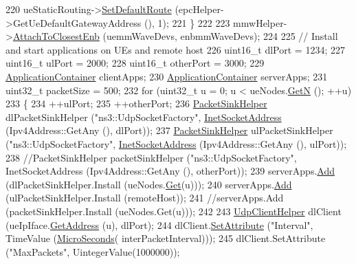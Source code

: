 \begin{DoxyCode}
220         ueStaticRouting->\hyperlink{classns3_1_1Ipv4StaticRouting_aee30fa3246c2b42f122dabdff2725331}{SetDefaultRoute} (epcHelper->GetUeDefaultGatewayAddress (), 1);
221   \}
222 
223   mmwHelper->\hyperlink{classns3_1_1MmWaveHelper_a202baea67b0af0d4fb6069de73766dc6}{AttachToClosestEnb} (uemmWaveDevs, enbmmWaveDevs);
224 
225   \textcolor{comment}{// Install and start applications on UEs and remote host}
226   uint16\_t dlPort = 1234;
227   uint16\_t ulPort = 2000;
228   uint16\_t otherPort = 3000;
229   \hyperlink{classns3_1_1ApplicationContainer}{ApplicationContainer} clientApps;
230   \hyperlink{classns3_1_1ApplicationContainer}{ApplicationContainer} serverApps;
231   uint32\_t packetSize = 500;
232   \textcolor{keywordflow}{for} (uint32\_t u = 0; u < ueNodes.\hyperlink{classns3_1_1NodeContainer_aed647ac56d0407a7706aba02eb44b951}{GetN} (); ++u)
233   \{
234         ++ulPort;
235         ++otherPort;
236         \hyperlink{classns3_1_1PacketSinkHelper}{PacketSinkHelper} dlPacketSinkHelper (\textcolor{stringliteral}{"ns3::UdpSocketFactory"}, 
      \hyperlink{classns3_1_1InetSocketAddress}{InetSocketAddress} (Ipv4Address::GetAny (), dlPort));
237         \hyperlink{classns3_1_1PacketSinkHelper}{PacketSinkHelper} ulPacketSinkHelper (\textcolor{stringliteral}{"ns3::UdpSocketFactory"}, 
      \hyperlink{classns3_1_1InetSocketAddress}{InetSocketAddress} (Ipv4Address::GetAny (), ulPort));
238         \textcolor{comment}{//PacketSinkHelper packetSinkHelper ("ns3::UdpSocketFactory", InetSocketAddress
       (Ipv4Address::GetAny (), otherPort));}
239         serverApps.\hyperlink{classns3_1_1ApplicationContainer_ad09ab1a1ad5849d518d5f4c262e38152}{Add} (dlPacketSinkHelper.Install (ueNodes.\hyperlink{classns3_1_1NodeContainer_a9ed96e2ecc22e0f5a3d4842eb9bf90bf}{Get}(u)));
240         serverApps.\hyperlink{classns3_1_1ApplicationContainer_ad09ab1a1ad5849d518d5f4c262e38152}{Add} (ulPacketSinkHelper.Install (remoteHost));
241         \textcolor{comment}{//serverApps.Add (packetSinkHelper.Install (ueNodes.Get(u)));}
242 
243         \hyperlink{classns3_1_1UdpClientHelper}{UdpClientHelper} dlClient (ueIpIface.\hyperlink{classns3_1_1Ipv4InterfaceContainer_ae63208dcd222be986822937ee4aa828c}{GetAddress} (u), dlPort);
244         dlClient.\hyperlink{classns3_1_1UdpClientHelper_a8bbae16a28f85ab3f3b5aa4642edfeae}{SetAttribute} (\textcolor{stringliteral}{"Interval"}, TimeValue (\hyperlink{group__timecivil_ga17465a639c8d1464e76538afdd78a9f0}{MicroSeconds}(
      interPacketInterval)));
245         dlClient.SetAttribute (\textcolor{stringliteral}{"MaxPackets"}, UintegerValue(1000000));

\end{DoxyCode}

